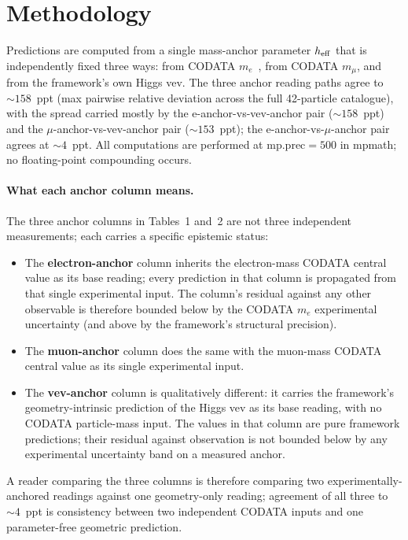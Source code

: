 \documentclass[reprint,amsmath,amssymb,aps,prd,longbibliography,floatfix]{revtex4-2}
\begin{document}
\fi

\maketitle

\section{Methodology}

Predictions are computed from a single mass-anchor parameter
$h_{\rm eff}$ that is independently fixed three ways: from CODATA
$m_e$~\cite{CODATA2022}, from CODATA $m_\mu$, and from the
framework's own Higgs vev. The three anchor reading paths agree
to $\sim 158$~ppt (max pairwise relative deviation across the full
42-particle catalogue), with the spread carried mostly by the
e-anchor-vs-vev-anchor pair ($\sim 158$~ppt) and the
$\mu$-anchor-vs-vev-anchor pair ($\sim 153$~ppt); the
e-anchor-vs-$\mu$-anchor pair agrees at $\sim 4$~ppt. All
computations are performed at $\mathrm{mp.prec}=500$ in mpmath; no
floating-point compounding occurs.

\paragraph{What each anchor column means.}
The three anchor columns in Tables~1 and~2 are not three
independent measurements; each carries a specific epistemic status:
\begin{itemize}\itemsep0pt
\item The \textbf{electron-anchor} column inherits the
electron-mass CODATA central value as its base reading; every
prediction in that column is propagated from that single
experimental input. The column's residual against any other
observable is therefore bounded below by the CODATA $m_e$
experimental uncertainty (and above by the framework's structural
precision).
\item The \textbf{muon-anchor} column does the same with the
muon-mass CODATA central value as its single experimental input.
\item The \textbf{vev-anchor} column is qualitatively different:
it carries the framework's geometry-intrinsic prediction of the
Higgs vev as its base reading, with no CODATA particle-mass input.
The values in that column are pure framework predictions; their
residual against observation is not bounded below by any
experimental uncertainty band on a measured anchor.
\end{itemize}
A reader comparing the three columns is therefore comparing two
experimentally-anchored readings against one geometry-only
reading; agreement of all three to $\sim 4$~ppt is consistency
between two independent CODATA inputs and one parameter-free
geometric prediction.
\end{document}
